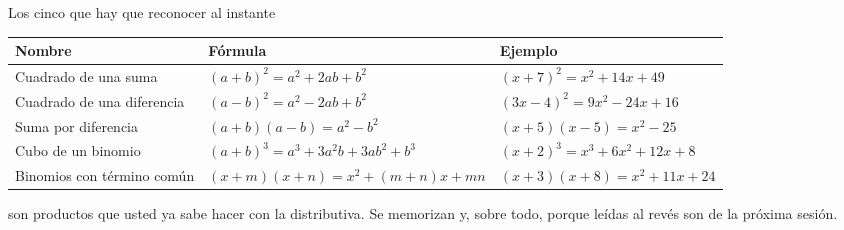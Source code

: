 \documentclass[aspectratio=169,10pt]{beamer}
\begin{document}
\begin{frame}{Los cinco que hay que reconocer al instante}
  \scriptsize
  \begin{center}
  \begin{tabular}{@{}p{3.4cm}p{4.2cm}p{4.4cm}@{}}
    \toprule
    \textbf{Nombre} & \textbf{Fórmula} & \textbf{Ejemplo} \\
    \midrule
    Cuadrado de una suma &
      $(a+b)^{2} = a^{2}+2ab+b^{2}$ &
      $(x+7)^{2} = x^{2}+14x+49$ \\
    \addlinespace
    Cuadrado de una diferencia &
      $(a-b)^{2} = a^{2}-2ab+b^{2}$ &
      $(3x-4)^{2} = 9x^{2}-24x+16$ \\
    \addlinespace
    Suma por diferencia &
      $(a+b)(a-b) = a^{2}-b^{2}$ &
      $(x+5)(x-5) = x^{2}-25$ \\
    \addlinespace
    Cubo de un binomio &
      $(a+b)^{3} = a^{3}+3a^{2}b+3ab^{2}+b^{3}$ &
      $(x+2)^{3} = x^{3}+6x^{2}+12x+8$ \\
    \addlinespace
    Binomios con término común &
      $(x+m)(x+n) = x^{2}+(m+n)x+mn$ &
      $(x+3)(x+8) = x^{2}+11x+24$ \\
    \bottomrule
  \end{tabular}
  \end{center}

  \vspace{0.05cm}
  {\tiny\color{uniGris}  son productos que
  usted ya sabe hacer con la distributiva. Se memorizan  y, sobre todo, porque leídas al revés son 
  de la próxima sesión.}
\end{frame}
\end{document}

